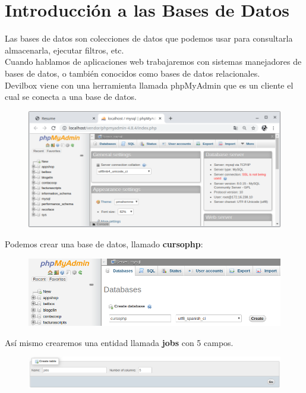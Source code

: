\documentclass{article}
\begin{document}
\section{Introducción a las Bases de Datos}%
Las bases de datos son colecciones de datos que podemos usar para consultarla
almacenarla, ejecutar filtros, etc.\\

Cuando hablamos de aplicaciones web trabajaremos con sistemas manejadores de
bases de datos, o también conocidos como bases de datos relacionales.\\

Devilbox viene con una herramienta llamada phpMyAdmin que es un cliente el cual
se conecta a una base de datos.\\

\begin{figure}[h!]
  \centering
  \includegraphics[scale=0.5]{./Pictures/064_phpmyadmin.png}
\end{figure}

\newpage

Podemos crear una base de datos, llamado \textbf{cursophp}:

\begin{figure}[h!]
  \centering
  \includegraphics[scale=0.5]{./Pictures/065_cursophp.png}
\end{figure}

Así mismo crearemos una entidad llamada \textbf{jobs} con 5 campos.

\begin{figure}[h!]
  \centering
  \includegraphics[scale=0.5]{./Pictures/066_crear_tabla_jobs.png}
\end{figure}
\end{document}
